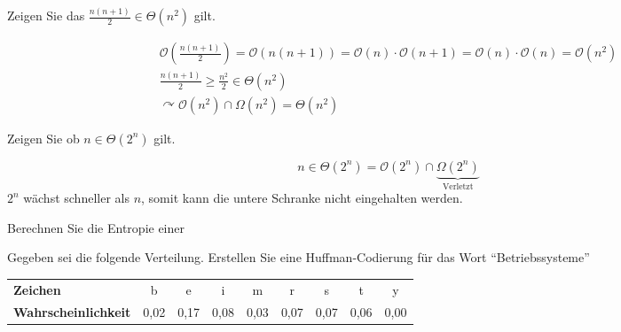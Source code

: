 \documentclass[a4paper,11pt]{exam}
\begin{document}
\begin{questions}
	\question Zeigen Sie das \(\frac{n(n+1)}{2} \in \Theta(n^{2})\) gilt.
	\begin{solution}
		\begin{eqnarray*}
			\mathcal{O}(\frac{n(n+1)}{2}) = \mathcal{O}(n(n+1)) = \mathcal{O}(n) \cdot \mathcal{O}(n+1) = \mathcal{O}(n) \cdot \mathcal{O}(n) = \mathcal{O}(n^{2}) \\
			\frac{n(n+1)}{2} \geq \frac{n^{2}}{2} \in \Theta(n^{2}) \\
			\curvearrowright \mathcal{O}(n^{2}) \cap \Omega(n^{2}) = \Theta(n^{2})
		\end{eqnarray*}
	\end{solution}

	\question Zeigen Sie ob \(n \in \Theta(2^n)\) gilt.
	\begin{solution}
		\[n \in \Theta(2^n) = \mathcal{O}(2^n) \cap \underbrace{\Omega(2^n)}_{\textrm{Verletzt}}\]
		\(2^n\) wächst schneller als \(n\), somit kann die untere Schranke nicht eingehalten werden.
	\end{solution}
	
	\question Berechnen Sie die Entropie einer 
	
	\begin{solution}
	\end{solution}


	
	\question Gegeben sei die folgende Verteilung. Erstellen Sie eine Huffman-Codierung für das Wort ``Betriebssysteme''
	\begin{table}[htbp]
		\centering
		\begin{tabular}{l|cccccccc}
			\textbf{Zeichen}			& b	& e & i& m & r & s & t & y\\
			\textbf{Wahrscheinlichkeit}	& 0,02 & 0,17 & 0,08 & 0,03 & 0,07 & 0,07 & 0,06 & 0,00
		\end{tabular}
	\end{table}



\end{questions}
\end{document}
